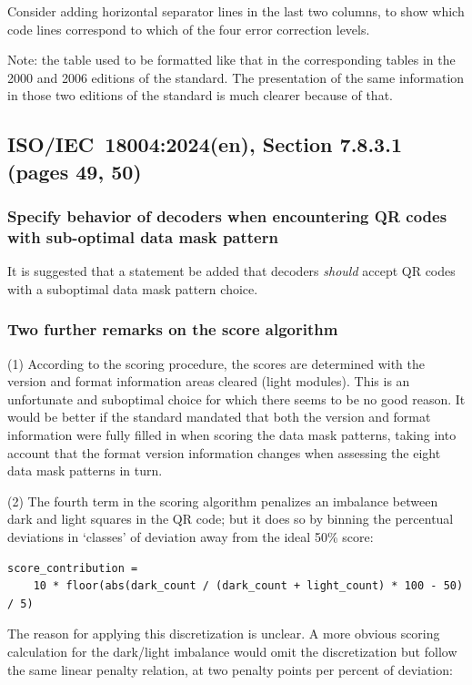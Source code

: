\documentclass[a4paper,twoside]{article}
\newcommand{\shortstandard}{ISO/IEC~18004}
\newcommand{\standard}{\shortstandard:2024(en)}
\begin{document}
Consider adding horizontal separator lines in the last two columns, to show
which code lines correspond to which of the four error correction levels.

Note: the table used to be formatted like that in the corresponding tables in the 2000
and 2006 editions of the standard. The presentation of the same information in those two
editions of the standard is much clearer because of that.

\subsection{\standard, Section 7.8.3.1 (pages 49, 50)}
\label{sec:dmp-scoring}

\subsubsection*{Specify behavior of decoders when encountering QR codes with sub-optimal data mask pattern}

It is suggested that a statement be added that decoders \emph{should} accept QR codes with a suboptimal data mask
pattern choice.

\subsubsection*{Two further remarks on the score algorithm}

(1) According to the scoring procedure, the scores are determined with the version and format information areas
cleared (light modules). This is an unfortunate and suboptimal choice for which there seems to be no good reason.
It would be better if the standard mandated that both the version and format information were fully filled in when 
scoring the data mask patterns, taking into account that the format version information changes when assessing
the eight data mask patterns in turn.

(2) The fourth term in the scoring algorithm penalizes an imbalance between dark and light
squares in the QR code; but it does so by binning the percentual deviations in `classes' of
deviation away from the ideal 50\% score:

\begin{verbatim}
score_contribution =
    10 * floor(abs(dark_count / (dark_count + light_count) * 100 - 50) / 5)
\end{verbatim}

The reason for applying this discretization is unclear. A more obvious scoring calculation for the
dark/light imbalance would omit the discretization but follow the same linear penalty relation,
at two penalty points per percent of deviation:
\end{document}
